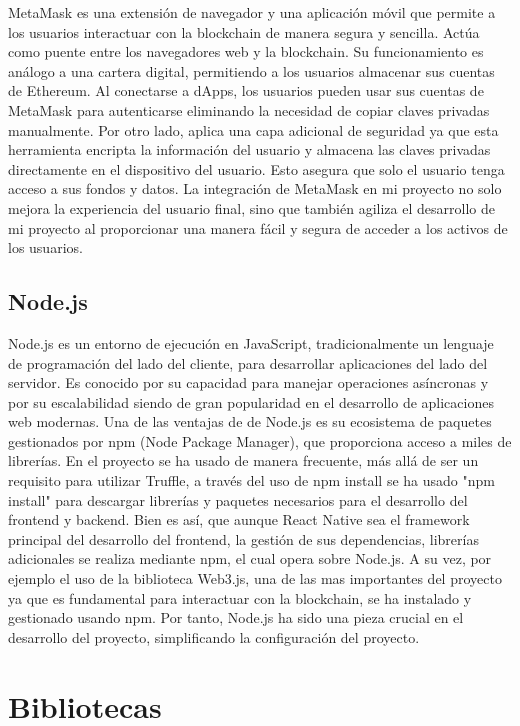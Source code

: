 MetaMask es una extensión de navegador y una aplicación móvil que permite a los usuarios interactuar con la blockchain de manera segura y sencilla. Actúa como puente entre los navegadores web y la blockchain.
Su funcionamiento es análogo a una cartera digital, permitiendo a los usuarios almacenar sus cuentas de Ethereum.
Al conectarse a dApps, los usuarios pueden usar sus cuentas de MetaMask para autenticarse eliminando la necesidad de copiar claves privadas manualmente. Por otro lado, aplica una capa adicional de seguridad ya que esta herramienta encripta la información del usuario y almacena las claves privadas directamente en el dispositivo del usuario. Esto asegura que solo el usuario tenga acceso a sus fondos y datos.
La integración de MetaMask en mi proyecto no solo mejora la experiencia del usuario final, sino que también agiliza el desarrollo de mi proyecto al proporcionar una manera fácil y segura de acceder a los activos de los usuarios.


\subsection{Node.js}

Node.js es un entorno de ejecución en JavaScript, tradicionalmente un lenguaje de programación del lado del cliente, para desarrollar aplicaciones del lado del servidor. Es conocido por su capacidad para manejar operaciones asíncronas y por su escalabilidad siendo de gran popularidad en el desarrollo de aplicaciones web modernas. Una de las ventajas de de Node.js es su ecosistema de paquetes gestionados por npm (Node Package Manager), que proporciona acceso a miles de librerías.
En el proyecto se ha usado de manera frecuente, más allá de ser un requisito para utilizar Truffle, a través del uso de npm install se ha usado "npm install" para descargar librerías y paquetes necesarios para el desarrollo del frontend y backend.
Bien es así, que aunque React Native sea el framework principal del desarrollo del frontend, la gestión de sus dependencias, librerías adicionales se realiza mediante npm, el cual opera sobre Node.js.
A su vez, por ejemplo el uso de la biblioteca Web3.js, una de las mas importantes del proyecto ya que es fundamental para interactuar con la blockchain, se ha instalado y gestionado usando npm.
Por tanto, Node.js ha sido una pieza crucial en el desarrollo del proyecto, simplificando la configuración del proyecto.


\section{Bibliotecas}


